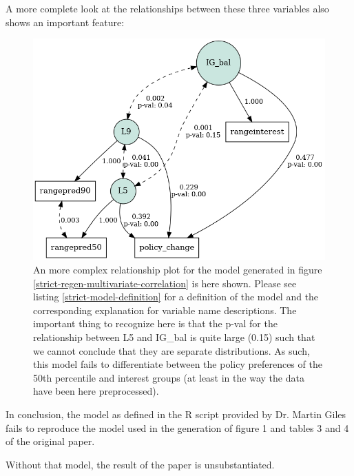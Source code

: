 \documentclass[]{article}
\begin{document}
A more complete look at the relationships between these three variables also shows an important feature:
\begin{figure}[H]
	\begin{center}
		\includegraphics[width=\linewidth]{./figures/generated/multivariate-analysis/strict-regen-multivariate-correlation-full.png}
	\end{center}
	\caption{An more complex relationship plot for the model generated in figure \ref{strict-regen-multivariate-correlation} is here shown. Please see listing \ref{strict-model-definition} for a definition of the model and the corresponding explanation for variable name descriptions. The important thing to recognize here is that the p-val for the relationship between L5 and IG\_bal is quite large (0.15) such that we cannot conclude that they are separate distributions. As such, this model fails to differentiate between the policy preferences of the 50th percentile and interest groups (at least in the way the data have been here preprocessed).}
	\label{strict-regen-multivariate-correlation-full}
\end{figure}

In conclusion, the model as defined in the R script provided by Dr. Martin Giles fails to reproduce the model used in the generation of figure 1 and tables 3 and 4 of the original paper.

Without that model, the result of the paper is unsubstantiated.
\end{document}

